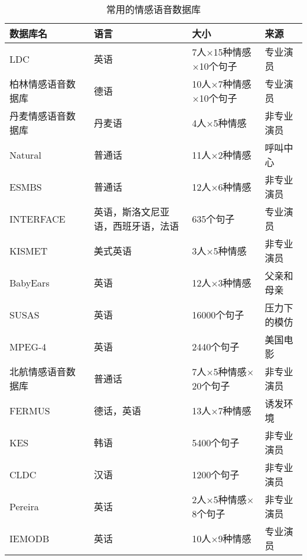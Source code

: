 \begin{table}[htb]
\centering
    \begin{minipage}[t]{0.8\linewidth} %
    \caption{常用的情感语音数据库}
    \label{tab:emo_database}
        \begin{tabularx}{\linewidth}{X<{\centering} X<{\centering} X<{\centering} X<{\centering}}
            \toprule[1.5pt]
            数据库名 & 语言 & 大小 & 来源 \\
            \midrule[1pt]
            LDC~\cite{LibermanEmotional} & 英语 & 7人$\times$15种情感$\times$10个句子 & 专业演员 \\
            柏林情感语音数据库~\cite{Burkhardt2005A} & 德语 & 10人$\times$7种情感$\times$10个句子 & 专业演员 \\
            丹麦情感语音数据库~\cite{Engberg1997Design} & 丹麦语 & 4人$\times$5种情感 & 非专业演员 \\
            Natural~\cite{Morrison2007Ensemble} & 普通话 & 11人$\times$2种情感 & 呼叫中心 \\
            ESMBS~\cite{Nogueiras2012Speech} & 普通话 & 12人$\times$6种情感 & 非专业演员 \\
            INTERFACE~\cite{Hozjan2002Interface} & 英语，斯洛文尼亚语，西班牙语，法语 & 635个句子 & 专业演员 \\
            KISMET~\cite{Breazeal2002Recognition} & 美式英语 & 3人$\times$5种情感 & 非专业演员 \\
            BabyEars~\cite{Slaney2003Baby} & 英语 & 12人$\times$3种情感 & 父亲和母亲 \\
            SUSAS~\cite{Hansen1997Getting} & 英语 & 16000个句子 & 压力下的模仿 \\
            MPEG-4~\cite{Schuller2005Speaker} & 英语 & 2440个句子 & 美国电影 \\
            北航情感语音数据库~\cite{Fu2008Speaker} & 普通话 & 7人$\times$5种情感$\times$20个句子 & 非专业演员 \\
            FERMUS \uppercase\expandafter{\romannumeral3}~\cite{Schuller2002Towards} & 德话，英语 & 13人$\times$7种情感 & 诱发环境 \\
            KES~\cite{Kim2007Speech} & 韩语 & 5400个句子 & 非专业演员 \\
            CLDC~\cite{Zhou2006Speech} & 汉语 & 1200个句子 & 非专业演员 \\
            Pereira~\cite{Pereira2000Dimensions} & 英话 & 2人$\times$5种情感$\times$8个句子 & 非专业演员 \\
            IEMODB~\cite{Busso2008IEMOCAP} & 英话 & 10人$\times$9种情感 & 专业演员 \\
            \bottomrule[1.5pt]
        \end{tabularx}
    \end{minipage}
\end{table}

